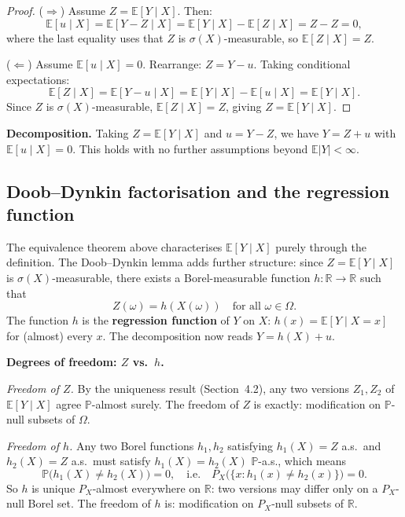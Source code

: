\documentclass[a4paper,oneside,12pt]{extarticle}
\theoremstyle{plain}
\theoremstyle{definition}
\theoremstyle{remark}
\newcommand*{\E}{\mathbb{E}}
\newcommand*{\mP}{\mathbb{P}}
\newcommand*{\mR}{\mathbb{R}}
\begin{document}
\begin{proof}
($\Rightarrow$) Assume $Z = \E[Y \mid X]$. Then:
\[
\E[u \mid X] = \E[Y - Z \mid X] = \E[Y \mid X] - \E[Z \mid X] = Z - Z = 0,
\]
where the last equality uses that $Z$ is $\sigma(X)$-measurable, so
$\E[Z \mid X] = Z$.

($\Leftarrow$) Assume $\E[u \mid X] = 0$. Rearrange: $Z = Y - u$.
Taking conditional expectations:
\[
\E[Z \mid X] = \E[Y - u \mid X] = \E[Y \mid X] - \E[u \mid X] = \E[Y \mid X].
\]
Since $Z$ is $\sigma(X)$-measurable, $\E[Z \mid X] = Z$, giving
$Z = \E[Y \mid X]$.
\end{proof}

\textbf{Decomposition.}
Taking $Z = \E[Y \mid X]$ and $u = Y - Z$, we have $Y = Z + u$ with
$\E[u \mid X] = 0$. This holds with no further assumptions beyond
$\E|Y| < \infty$.

\subsection{Doob--Dynkin factorisation and the regression function}

The equivalence theorem above characterises $\E[Y \mid X]$ purely
through the definition. The Doob--Dynkin lemma adds further structure:
since $Z = \E[Y \mid X]$ is $\sigma(X)$-measurable, there exists a
Borel-measurable function $h: \mR \to \mR$ such that
\[
  Z(\omega) = h(X(\omega)) \quad \text{for all } \omega \in \Omega.
\]
The function $h$ is the \textbf{regression function} of $Y$ on $X$:
$h(x) = \E[Y \mid X = x]$ for (almost) every $x$.
The decomposition now reads $Y = h(X) + u$.

\textbf{Degrees of freedom: $Z$ vs.\ $h$.}

\textit{Freedom of $Z$.}
By the uniqueness result (Section~4.2), any two versions $Z_1, Z_2$ of
$\E[Y \mid X]$ agree $\mP$-almost surely. The freedom of $Z$ is
exactly: modification on $\mP$-null subsets of $\Omega$.

\textit{Freedom of $h$.}
Any two Borel functions $h_1, h_2$ satisfying $h_1(X) = Z$ a.s.\ and
$h_2(X) = Z$ a.s.\ must satisfy $h_1(X) = h_2(X)$ $\mP$-a.s., which
means
\[
  \mP\bigl(h_1(X) \neq h_2(X)\bigr) = 0,
  \quad\text{i.e.}\quad
  P_X\bigl(\{x : h_1(x) \neq h_2(x)\}\bigr) = 0.
\]
So $h$ is unique $P_X$-almost everywhere on $\mR$: two versions may
differ only on a $P_X$-null Borel set. The freedom of $h$ is:
modification on $P_X$-null subsets of $\mR$.
\end{document}
